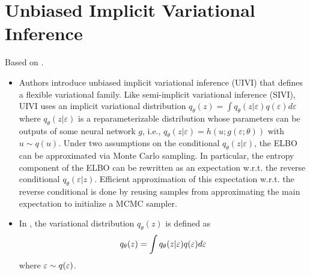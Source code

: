 \documentclass[10pt]{article}
\begin{document}
\tableofcontents

\newpage

\section{Unbiased Implicit Variational Inference}

Based on \citet{Titsias:2019}.

\begin{itemize}

\item
Authors introduce unbiased implicit variational inference (UIVI) that defines a flexible variational family. Like semi-implicit variational inference (SIVI), UIVI uses an implicit variational distribution $q_\theta(z)=\int q_\theta(z|\varepsilon)q(\varepsilon)d\varepsilon$ where $q_\theta(z|\varepsilon)$ is a reparameterizable distribution whose parameters can be outputs of some neural network $g$, i.e., $q_\theta(z|\varepsilon)=h(u;g(\varepsilon;\theta))$ with $u\sim q(u)$. Under two assumptions on the conditional $q_\theta(z|\varepsilon)$, the ELBO can be approximated via Monte Carlo sampling. In particular, the entropy component of the ELBO can be rewritten as an expectation w.r.t. the reverse conditional $q_\theta(\varepsilon|z)$. Efficient approximation of this expectation w.r.t. the reverse conditional is done by reusing samples from approximating the main expectation to initialize a MCMC sampler.

\item
In \sivi, the variational distribution $q_\theta(z)$ is defined as
\[
q_\theta(z) = \int q_\theta(z|\varepsilon)q(\varepsilon)d\varepsilon
\]
where $\varepsilon\sim q(\varepsilon)$.


\end{itemize}
\end{document}
